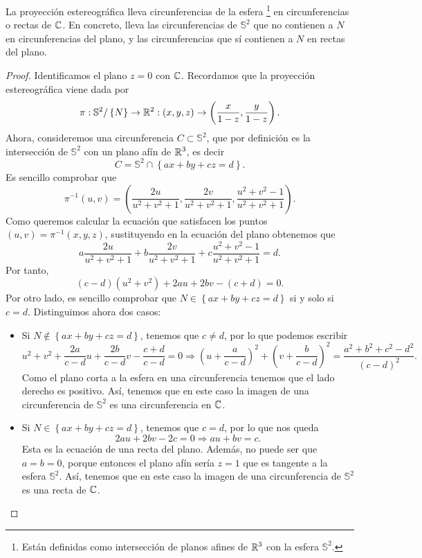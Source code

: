 \begin{theorem}
	La proyección estereográfica lleva circunferencias de la esfera \footnote{Están definidas como intersección de planos afines de $\displaystyle \mathbb{R}^{3} $ con la esfera $\displaystyle \mathbb{S}^{2} $.} en circunferencias o rectas de $\displaystyle \mathbb{C} $. En concreto, lleva las circunferencias de $\displaystyle \mathbb{S}^{2} $ que no contienen a $\displaystyle N $ en circunferencias del plano, y las circunferencias que sí contienen a $\displaystyle N $ en rectas del plano.  
\end{theorem}
\begin{proof}
Identificamos el plano $\displaystyle z = 0 $ con $\displaystyle \mathbb{C} $. Recordamos que la proyección estereográfica viene dada por
\[\pi : \mathbb{S}^{2} / \left\{ N\right\} \to \mathbb{R}^{2} : \left(x,y,z\right) \to \left(\frac{x}{1-z}, \frac{y}{1-z}\right) .\]
Ahora, consideremos una circunferencia $\displaystyle C \subset \mathbb{S}^{2} $, que por definición es la intersección de $\displaystyle \mathbb{S}^{2} $ con un plano afín de $\displaystyle \mathbb{R}^{3} $, es decir
\[C = \mathbb{S}^{2} \cap \left\{ ax + by + cz = d\right\}  .\]
Es sencillo comprobar que 
\[\pi^{-1}\left(u,v\right)=\left(\frac{2u}{u^{2}+v^{2}+1}, \frac{2v}{u^{2}+v^{2}+1}, \frac{u^{2}+v^{2}-1}{u^{2}+v^{2}+1}\right) .\]
Como queremos calcular la ecuación que satisfacen los puntos $\displaystyle \left(u,v\right)=\pi^{-1}\left(x,y,z\right) $, sustituyendo en la ecuación del plano obtenemos que 
\[a\frac{2u}{u^{2}+v^{2}+1} + b\frac{2v}{u^{2}+v^{2}+1}+c\frac{u^{2}+v^{2}-1}{u^{2}+v^{2}+1}=d .\]
Por tanto, 
\[\left(c-d\right)\left(u^{2}+v^{2}\right)+2au+2bv-\left(c+d\right)=0 .\] 
Por otro lado, es sencillo comprobar que $\displaystyle N \in \left\{ ax + by + cz = d\right\}  $ si y solo si $\displaystyle c = d $. 
Distinguimos ahora dos casos:
\begin{itemize}
	\item Si $\displaystyle N \not\in \left\{ ax + by + cz = d\right\}  $, tenemos que $\displaystyle c \neq d $, por lo que podemos escribir
		\[u^{2}+v^{2}+\frac{2a}{c-d}u+\frac{2b}{c-d}v-\frac{c+d}{c-d}=0 \Rightarrow \left(u + \frac{a}{c-d}\right)^{2}+\left(v + \frac{b}{c-d}\right)^{2} = \frac{a^{2}+b^{2}+c^{2}-d^{2}}{\left(c-d\right)^{2}} .\]
	Como el plano corta a la esfera en una circunferencia tenemos que el lado derecho es positivo. Así, tenemos que en este caso la imagen de una circunferencia de $\displaystyle \mathbb{S}^{2} $ es una circunferencia en $\displaystyle \mathbb{C} $. 
\item Si $\displaystyle N \in \left\{ ax + by + cz = d\right\}  $, tenemos que $\displaystyle c = d $, por lo que nos queda
	\[2au + 2bv - 2c = 0 \Rightarrow a u + bv = c .\]
	Esta es la ecuación de una recta del plano. Además, no puede ser que $\displaystyle a = b = 0 $, porque entonces el plano afín sería $\displaystyle z = 1 $ que es tangente a la esfera $\displaystyle \mathbb{S}^{2} $. Así, tenemos que en este caso la imagen de una circunferencia de $\displaystyle \mathbb{S}^{2} $ es una recta de $\displaystyle \mathbb{C} $. 
\end{itemize}

\end{proof}
